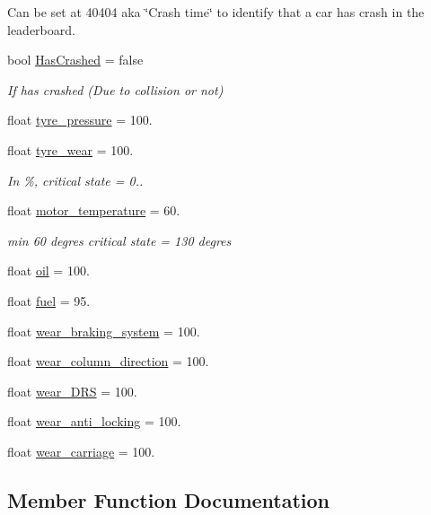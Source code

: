 \begin{DoxyCompactItemize}
\begin{DoxyCompactList}
 Can be set at 40404 aka \char`\"{}\+Crash time\char`\"{} to identify that a car has crash in the leaderboard. \end{DoxyCompactList}\item 
bool \hyperlink{class_cars_a92c95cf39dbdf1b65814b74d74ccfc5a}{Has\+Crashed} = false
\begin{DoxyCompactList}\small\item\em If has crashed (Due to collision or not) \end{DoxyCompactList}\item 
float \hyperlink{class_cars_ad7823c613c0375a6a8aa12a9e9905e2e}{tyre\+\_\+pressure} = 100.
\item 
float \hyperlink{class_cars_a1d8a98aae09009ac284ebe7b2b8bcd7b}{tyre\+\_\+wear} = 100.
\begin{DoxyCompactList}\small\item\em In \%, critical state = 0.. \end{DoxyCompactList}\item 
float \hyperlink{class_cars_afb6db39831b1b143d496405ddb3e0807}{motor\+\_\+temperature} = 60.
\begin{DoxyCompactList}\small\item\em min 60 degres critical state = 130 degres \end{DoxyCompactList}\item 
float \hyperlink{class_cars_a28cbb5119f146066362167ef0a539e72}{oil} = 100.
\item 
float \hyperlink{class_cars_a547066e8556129b421ee00ae008c954f}{fuel} = 95.
\item 
float \hyperlink{class_cars_a7b98ac5d85cb2e6e931fa34afe3a711a}{wear\+\_\+braking\+\_\+system} = 100.
\item 
float \hyperlink{class_cars_a7de567dc506302b9521cd58e4f85b233}{wear\+\_\+column\+\_\+direction} = 100.
\item 
float \hyperlink{class_cars_a0a8a4ceeb5baa9fa0e473b80a9202d47}{wear\+\_\+\+D\+RS} = 100.
\item 
float \hyperlink{class_cars_a81735db6f5a4ebb706309dadac1cb972}{wear\+\_\+anti\+\_\+locking} = 100.
\item 
float \hyperlink{class_cars_aadc6f4dcd0a8b9a0241606e7ca211b7c}{wear\+\_\+carriage} = 100.
\end{DoxyCompactItemize}


\subsection{Member Function Documentation}
\mbox{\label{class_cars_ae2d5dd594083b2fd32f47f12da04a8d7}} 
